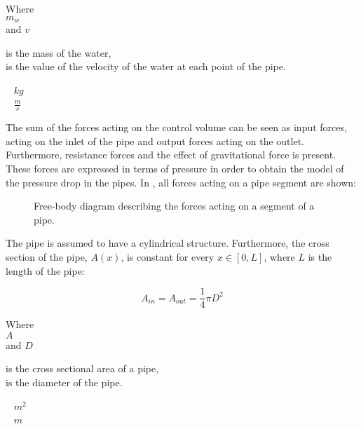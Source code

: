 \begin{minipage}[t]{0.20\textwidth}
Where\\
\hspace*{8mm} $m_w$ \\
and \hspace*{0.7mm} $v$ 
\end{minipage}
\begin{minipage}[t]{0.68\textwidth}
\vspace*{2mm}
is the mass of the water,\\
is the value of the velocity of the water at each point of the pipe.
\end{minipage}
\begin{minipage}[t]{0.10\textwidth}
\vspace*{2mm}
\textcolor{White}{te}$\unit{kg}$\\
\textcolor{White}{te}$\unit{\frac{m}{s}}$
\end{minipage}

The sum of the forces acting on the control volume can be seen as input forces, acting on the inlet of the pipe and output forces acting on the outlet. Furthermore, resistance forces and the effect of gravitational force is present.  
These forces are expressed in terms of pressure in order to obtain the model of the pressure drop in the pipes. In , all forces acting on a pipe segment are shown:

\begin{figure}[H]
\centering
 
\caption{Free-body diagram describing the forces acting on a segment of a pipe.}
\label{fig:pipe_freebody}
\end{figure}

The pipe is assumed to have a cylindrical structure. Furthermore, the cross section of the pipe, $A(x)$, is constant for every $x \in [0,L]$, where $L$ is the length of the pipe:

\begin{equation}
  A_{in} = A_{out} = \frac{1}{4}\pi D^{2}
\end{equation}

 \begin{minipage}[t]{0.20\textwidth}
Where\\
\hspace*{8mm} $A$ \\
and \hspace*{0.7mm} $D$
\end{minipage}
\begin{minipage}[t]{0.68\textwidth}
\vspace*{2mm}
is the cross sectional area of a pipe,\\
is the diameter of the pipe.
\end{minipage}
\begin{minipage}[t]{0.10\textwidth}
\vspace*{2mm}
\textcolor{White}{te}$\unit{m^{2}}$\\
\textcolor{White}{te}$\unit{m}$
\end{minipage}

